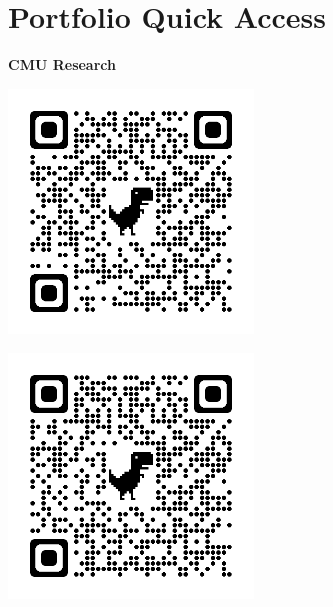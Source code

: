 \documentclass[letterpaper,10pt]{article}
\newcommand{\qrheader}[1]{
  \begin{center}
    \vspace{0.5cm}
    \textbf{#1}
  \end{center}
}
\begin{document}
\section{Portfolio Quick Access}

  \begin{center}
    \qrheader{CMU Research}
    \begin{minipage}{0.45\textwidth}
        \centering
        \includegraphics[width=6.5cm, height=6.5cm]{Figures/HUMRS.png}
        \label{fig:image1}
    \end{minipage}
    \hspace{0.05\textwidth}
    \begin{minipage}{0.45\textwidth}
        \centering
        \includegraphics[width=6.5cm, height=6.5cm]{Figures/Apple.png}
        \label{fig:image2}
    \end{minipage}
    \vspace{0.1cm} %
  \end{center}
\end{document}
